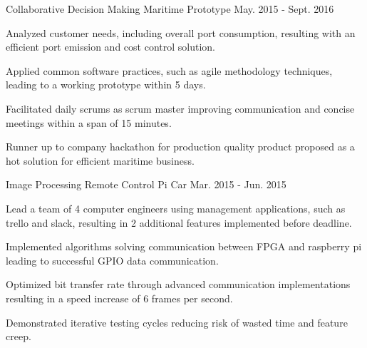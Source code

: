 

\begin{cventries}

  \cvtechentry
    {Collaborative Decision Making Maritime Prototype} %
    {} %
    {} %
    {May. 2015 - Sept. 2016} %
    {
      \begin{cvitems} %
        \item {Analyzed customer needs, including overall port consumption, resulting with an efficient port emission and cost control solution.}
        \item {Applied common software practices, such as agile methodology techniques, leading to a working prototype within 5 days.}
        \item {Facilitated daily scrums as scrum master improving communication and concise meetings within a span of 15 minutes.}
        \item {Runner up to company hackathon for production quality product proposed as a hot solution for efficient maritime business.}
      \end{cvitems}
    }
    
  \cvtechentry
    {Image Processing Remote Control Pi Car} %
    {} %
    {} %
    {Mar. 2015 - Jun. 2015} %
    {
      \begin{cvitems} %
        \item {Lead a team of 4 computer engineers using management applications, such as trello and slack, resulting in 2 additional features implemented before deadline.}
        \item {Implemented algorithms solving communication between FPGA and raspberry pi leading to successful GPIO data communication.}
        \item {Optimized bit transfer rate through advanced communication implementations resulting in a speed increase of 6 frames per second.}
        \item {Demonstrated iterative testing cycles reducing risk of wasted time and feature creep.}
      \end{cvitems}
    }
    

\end{cventries}

